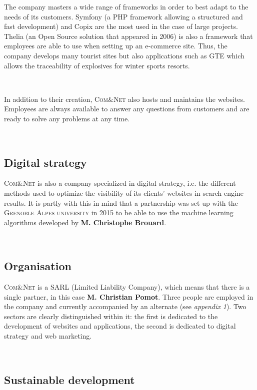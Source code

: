 \documentclass[12pt]{article}
\begin{document}
The company masters a wide range of frameworks in order to best adapt to the needs of its customers. \textsf{Symfony} (a \textsf{PHP} framework allowing a structured and fast development) and \textsf{Copix} are the most used in the case of large projects. \textsf{Thelia} (an Open Source solution that appeared in 2006) is also a framework that employees are able to use when setting up an e-commerce site. Thus, the company develops many tourist sites but also applications such as \textsc{GTE} which allows the traceability of explosives for winter sports resorts.

\

In addition to their creation, \textsc{Com\&Net} also hosts and maintains the websites. Employees are always available to answer any questions from customers and are ready to solve any problems at any time.

\

\subsection{Digital strategy}

\textsc{Com\&Net} is also a company specialized in digital strategy, i.e. the different methods used to optimize the visibility of its clients' websites in search engine results. It is partly with this in mind that a partnership was set up with the \textsc{Grenoble Alpes university} in 2015 to be able to use the machine learning algorithms developed by \textbf{M. Christophe Brouard}.

\

\subsection{Organisation}

\textsc{Com\&Net} is a \textsf{SARL} (Limited Liability Company), which means that there is a single partner, in this case \textbf{M. Christian Pomot}. Three people are employed in the company and currently accompanied by an alternate (see \textsl{appendix 1}). Two sectors are clearly distinguished within it: the first is dedicated to the development of websites and applications, the second is dedicated to digital strategy and web marketing.

\

\subsection{Sustainable development}
\end{document}
